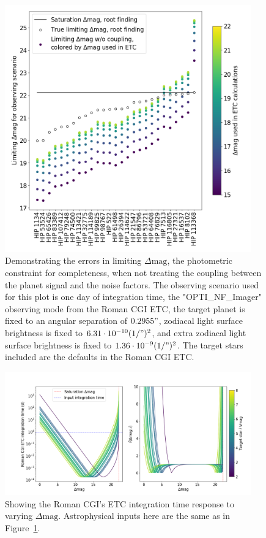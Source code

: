 \begin{figure}
  \begin{center}
    \includegraphics[width=0.95\textwidth]{ch2/figures/coupling.png}
  \end{center}
  \caption{Demonstrating the errors in limiting $\Delta\textrm{mag}$, the
  photometric constraint for completeness, when not treating the coupling
  between the planet signal and the noise factors. The observing scenario
  used for this plot is one day of integration time, the "OPTI\_NF\_Imager"
  observing mode from the Roman CGI ETC, the target planet is fixed to an
  angular separation of $0.2955"$, zodiacal light surface brightness is fixed to
  $6.31\cdot10^{-10} (1/")^2$, and extra zodiacal light surface brightness is
  fixed to $1.36\cdot10^{-9} (1/")^2$. The target stars included are the defaults
  in the Roman CGI ETC.}
  \label{fig:CGI_coupling}
\end{figure}

\begin{figure}
  \begin{center}
    \includegraphics[width=0.95\textwidth]{ch2/figures/ETC_dMag_function.png}
  \end{center}
  \caption{Showing the Roman CGI's ETC integration time response to varying
  $\Delta\textrm{mag}$. Astrophysical inputs here are the same
  as in Figure~\ref{fig:CGI_coupling}.}
  \label{fig:ETC_dMag_function}
\end{figure}


